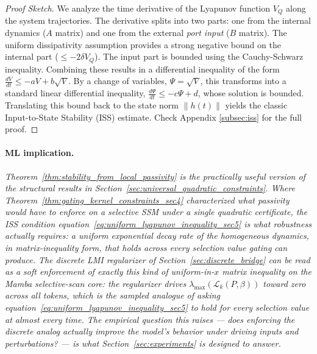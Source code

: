 \documentclass[10pt]{article} %
\def\eqref#1{equation~\ref{#1}}
\theoremstyle{definition}
\begin{document}
\begin{proof}[Proof Sketch]
We analyze the time derivative of the Lyapunov function $V_Q$ along the system trajectories. The derivative splits into two parts: one from the internal dynamics ($A$ matrix) and one from the external \emph{port input} ($B$ matrix). The uniform dissipativity assumption provides a strong negative bound on the internal part ($\le -2\delta V_Q$). The input part is bounded using the Cauchy-Schwarz inequality. Combining these results in a differential inequality of the form $\frac{dV}{dt} \le -aV + b\sqrt{V}$. By a change of variables, $\Psi = \sqrt{V}$, this transforms into a standard linear differential inequality, $\frac{d\Psi}{dt} \le -c\Psi + d$, whose solution is bounded. Translating this bound back to the state norm $\|h(t)\|$ yields the classic Input-to-State Stability (ISS) estimate.
Check Appendix \ref{subsec:iss} for the full proof.
\end{proof}

\paragraph{ML implication.} \textit{Theorem~\ref{thm:stability_from_local_passivity} is the practically useful version of the structural results in Section~\ref{sec:universal_quadratic_constraints}. Where Theorem~\ref{thm:gating_kernel_constraints_sec4} characterized what passivity \emph{would have to} enforce on a selective SSM under a single quadratic certificate, the ISS condition \eqref{eq:uniform_lyapunov_inequality_sec5} is what robustness \emph{actually requires}: a uniform exponential decay rate of the homogeneous dynamics, in matrix-inequality form, that holds across every selection value gating can produce. The discrete LMI regularizer of Section~\ref{sec:discrete_bridge} can be read as a soft enforcement of exactly this kind of uniform-in-$x$ matrix inequality on the Mamba selective-scan core: the regularizer drives $\lambda_{\max}(\mathcal{L}_k(P,\beta))$ toward zero across all tokens, which is the sampled analogue of asking \eqref{eq:uniform_lyapunov_inequality_sec5} to hold for every selection value at almost every time. The empirical question this raises --- does enforcing the discrete analog actually improve the model's behavior under driving inputs and perturbations? --- is what Section~\ref{sec:experiments} is designed to answer.}
\end{document}
